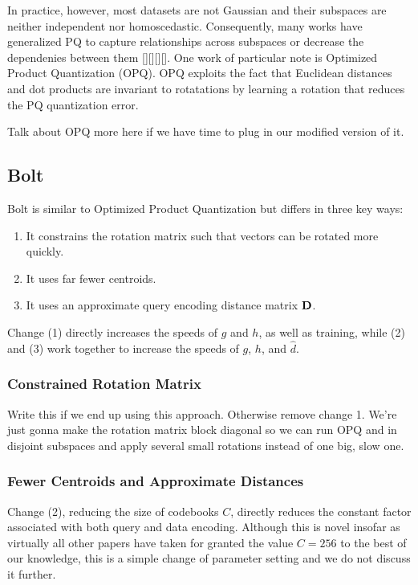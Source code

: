 In practice, however, most datasets are not Gaussian and their subspaces are neither independent nor homoscedastic. Consequently, many works have generalized PQ to capture relationships across subspaces or decrease the dependenies between them [][][][]. One work of particular note is Optimized Product Quantization (OPQ). OPQ exploits the fact that Euclidean distances and dot products are invariant to rotatations by learning a rotation that reduces the PQ quantization error.

Talk about OPQ more here if we have time to plug in our modified version of it.

\subsection{Bolt}

Bolt is similar to Optimized Product Quantization but differs in three key ways:
\begin{enumerate}
\item It constrains the rotation matrix such that vectors can be rotated more quickly.
\item It uses far fewer centroids.
\item It uses an approximate query encoding distance matrix $\mathbf{D}$.
\end{enumerate}

Change (1) directly increases the speeds of $g$ and $h$, as well as training, while (2) and (3) work together to increase the speeds of $g$, $h$, and $\hat{d}$.

\subsubsection{Constrained Rotation Matrix}

Write this if we end up using this approach. Otherwise remove change 1. We're just gonna make the rotation matrix block diagonal so we can run OPQ and in disjoint subspaces and apply several small rotations instead of one big, slow one.

\subsubsection{Fewer Centroids and Approximate Distances} \label{sec:boltVectorize}

Change (2), reducing the size of codebooks $C$, directly reduces the constant factor associated with both query and data encoding. Although this is novel insofar as virtually all other papers have taken for granted the value $C = 256$ to the best of our knowledge, this is a simple change of parameter setting and we do not discuss it further.

